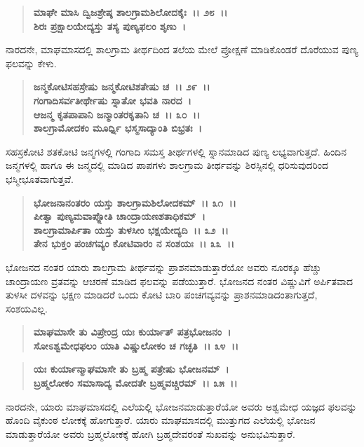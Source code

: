 \begin{verse}
\textbf{ಮಾಘೇ ಮಾಸಿ ದ್ವಿಜಶ್ರೇಷ್ಠ ಶಾಲಗ್ರಾಮಶಿಲೋದಕೈಃ~।। ೨೮~।। }\\\textbf{ಶಿರಃ ಪ್ರಕ್ಷಾಲಯೇದ್ಯಸ್ತು ತಸ್ಯ ಪುಣ್ಯಫಲಂ ಶೃಣು~।}
\end{verse}

ನಾರದನೇ, ಮಾಘಮಾಸದಲ್ಲಿ ಶಾಲಗ್ರಾಮ ತೀರ್ಥದಿಂದ ತಲೆಯ ಮೇಲೆ ಪ್ರೋಕ್ಷಣೆ ಮಾಡಿಕೊಂಡರೆ ದೊರೆಯುವ ಪುಣ್ಯ ಫಲವನ್ನು ಕೇಳು.

\begin{verse}
\textbf{ಜನ್ಮಕೋಟಿಸಹಸ್ರೇಷು ಜನ್ಮಕೋಟಿಶತೇಷು ಚ~।। ೨೯~।।}\\\textbf{ಗಂಗಾದಿಸರ್ವತೀರ್ಥೇಷು ಸ್ನಾತೋ ಭವತಿ ನಾರದ~। }\\\textbf{ಆಜನ್ಮ ಕೃತಪಾಪಾನಿ ಜನ್ಮಾಂತರಕೃತಾನಿ ಚ~।। ೩೦~।।} \\\textbf{ಶಾಲಗ್ರಾಮೋದಕಂ ಮೂರ್ಧ್ನಿ ಭಸ್ಮಸಾದ್ಯಾಂತಿ ಬಿಭ್ರತಃ~।}
\end{verse}

ಸಹಸ್ರಕೋಟಿ ಶತಕೋಟಿ ಜನ್ಮಗಳಲ್ಲಿ ಗಂಗಾದಿ ಸಮಸ್ತ ತೀರ್ಥಗಳಲ್ಲಿ ಸ್ನಾನಮಾಡಿದ ಪುಣ್ಯ ಲಭ್ಯವಾಗುತ್ತದೆ. ಹಿಂದಿನ ಜನ್ಮಗಳಲ್ಲಿ ಹಾಗೂ ಈ ಜನ್ಮದಲ್ಲಿ ಮಾಡಿದ ಪಾಪಗಳು ಶಾಲಗ್ರಾಮ ತೀರ್ಥವನ್ನು ಶಿರಸ್ಸಿನಲ್ಲಿ ಧರಿಸುವುದರಿಂದ ಭಸ್ಮೀಭೂತವಾಗುತ್ತವೆ.

\begin{verse}
\textbf{ಭೋಜನಾನಂತರಂ ಯಸ್ತು ಶಾಲಗ್ರಾಮಶಿಲೋದಕಮ್~।। ೩೧~।।}\\\textbf{ಪೀತ್ವಾ ಪುಣ್ಯಮವಾಪ್ನೋತಿ ಚಾಂದ್ರಾಯಣಶತಾಧಿಕಮ್~। }\\\textbf{ಶಾಲಗ್ರಾಮಾರ್ಪಿತಾ ಯಸ್ತು ತುಳಸೀಂ ಭಕ್ಷಯೇದ್ಯದಿ~।। ೩೨~।।} \\\textbf{ತೇನ ಭುಕ್ತಂ ಪಂಚಗವ್ಯಂ ಕೋಟಿವಾರಂ ನ ಸಂಶಯಃ~।। ೩೩~।।}
\end{verse}

ಭೋಜನದ ನಂತರ ಯಾರು ಶಾಲಗ್ರಾಮ ತೀರ್ಥವನ್ನು ಪ್ರಾಶನಮಾಡುತ್ತಾರೆಯೋ ಅವರು ನೂರಕ್ಕೂ ಹೆಚ್ಚು ಚಾಂದ್ರಾಯಣ ವ್ರತವನ್ನು ಆಚರಣೆ ಮಾಡಿದ ಫಲವನ್ನು ಪಡೆಯುತ್ತಾರೆ. ಭೋಜನದ ನಂತರ ವಿಷ್ಣುವಿಗೆ ಅರ್ಪಿತವಾದ ತುಳಸೀ ದಳವನ್ನು ಭಕ್ಷಣ ಮಾಡಿದರೆ ಒಂದು ಕೋಟಿ ಬಾರಿ ಪಂಚಗವ್ಯವನ್ನು ಪ್ರಾಶನಮಾಡಿದಂತಾಗುತ್ತದೆ, ಸಂಶಯವಿಲ್ಲ.

\begin{verse}
\textbf{ಮಾಘಮಾಸೇ ತು ವಿಪ್ರೇಂದ್ರ ಯಃ ಕುರ್ಯಾತ್ ಪತ್ರಭೋಜನಂ~।}\\\textbf{ಸೋಽಶ್ವಮೇಧಫಲಂ ಯಾತಿ ವಿಷ್ಣುಲೋಕಂ ಚ ಗಚ್ಛತಿ~।। ೩೪~।। }
\end{verse}

\begin{verse}
\textbf{ಯಃ ಕುರ್ಯಾನ್ಮಾಘಮಾಸೇ ತು ಬ್ರಹ್ಮ ಪತ್ರೇಷು ಭೋಜನಮ್~।}\\\textbf{ಬ್ರಹ್ಮಲೋಕಂ ಸಮಾಸಾದ್ಯ ಮೋದತೇ ಬ್ರಹ್ಮವಚ್ಚಿರಮ್~।। ೩೫~।।}
\end{verse}

ನಾರದನೇ, ಯಾರು ಮಾಘಮಾಸದಲ್ಲಿ ಎಲೆಯಲ್ಲಿ ಭೋಜನಮಾಡುತ್ತಾರೆಯೋ ಅವರು ಅಶ್ವಮೇಧ ಯಜ್ಞದ ಫಲವನ್ನು ಹೊಂದಿ ವೈಕುಂಠ ಲೋಕಕ್ಕೆ ಹೋಗುತ್ತಾರೆ. ಯಾರು ಮಾಘಮಾಸದಲ್ಲಿ ಮುತ್ತುಗದ ಎಲೆಯಲ್ಲಿ ಭೋಜನ ಮಾಡುತ್ತಾರೆಯೋ ಅವರು ಬ್ರಹ್ಮಲೋಕಕ್ಕೆ ಹೋಗಿ ಬ್ರಹ್ಮದೇವರಂತೆ ಸುಖವನ್ನು ಅನುಭವಿಸುತ್ತಾರೆ.

